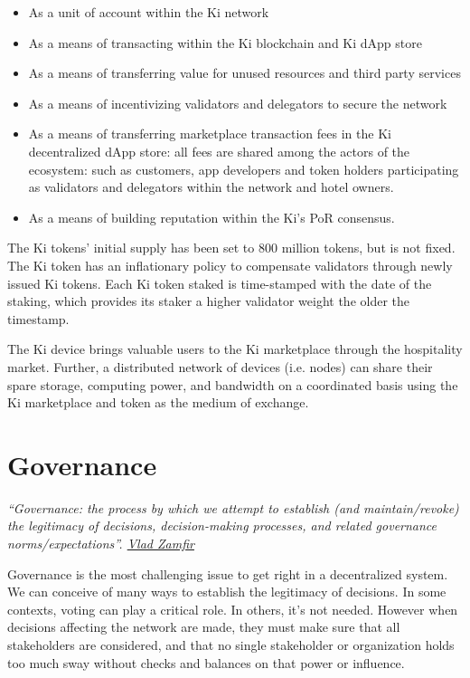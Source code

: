 \begin{itemize}
\item As a unit of account within the Ki network
\item As a means of transacting within the Ki blockchain and Ki dApp store
\item As a means of transferring value for unused resources and third party services
\item As a means of incentivizing validators and delegators to secure the network
\item As a means of transferring marketplace transaction fees in the Ki decentralized dApp store: all fees are shared among the actors of the ecosystem: such as customers, app developers and token holders participating as validators and delegators within the network and hotel owners.
\item As a means of building reputation within the Ki's PoR consensus.
\end{itemize}

The Ki tokens' initial supply has been set to 800 million tokens, but is not fixed. The Ki token has an inflationary policy to compensate validators through newly issued Ki tokens. Each Ki token staked is time-stamped with the date of the staking, which provides its staker a higher validator weight the older the timestamp.

The Ki device brings valuable users to the Ki marketplace through the hospitality market. Further, a distributed network of devices (i.e. nodes) can share their spare storage, computing power, and bandwidth on a coordinated basis using the Ki marketplace and token as the medium of exchange.


\section{Governance}
\textit{``Governance: the process by which we attempt to establish (and maintain/revoke) the legitimacy of decisions, decision-making processes, and related governance norms/expectations''. \href{https://twitter.com/VladZamfir/status/974026020234948608}{Vlad Zamfir}}


Governance is the most challenging issue to get right in a decentralized system. We can conceive of many ways to establish the legitimacy of decisions. In some contexts, voting can play a critical role. In others, it's not needed. However when decisions affecting the network are made, they must make sure that all stakeholders are considered, and that no single stakeholder or organization holds too much sway without checks and balances on that power or influence.

